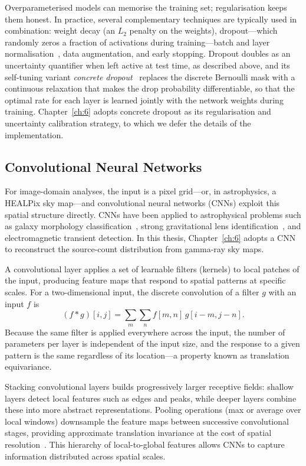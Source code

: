 Overparameterised models can memorise the training set; regularisation keeps them honest.
In practice, several complementary techniques are typically used in combination: weight decay (an $L_2$ penalty on the weights), dropout---which randomly zeros a fraction of activations during training---batch and layer normalisation~\cite{batchnorm}, data augmentation, and early stopping.
Dropout doubles as an uncertainty quantifier when left active at test time, as described above, and its self-tuning variant \textit{concrete dropout}~\cite{concrete-dropout} replaces the discrete Bernoulli mask with a continuous relaxation that makes the drop probability differentiable, so that the optimal rate for each layer is learned jointly with the network weights during training.
Chapter~\ref{ch:6} adopts concrete dropout as its regularisation and uncertainty calibration strategy, to which we defer the details of the implementation.

\subsection{Convolutional Neural Networks}
\label{sec:3.3.3}

For image-domain analyses, the input is a pixel grid---or, in astrophysics, a HEALPix sky map---and convolutional neural networks (CNNs) exploit this spatial structure directly.
CNNs have been applied to astrophysical problems such as galaxy morphology classification~\cite{Dieleman:2015wdg}, strong gravitational lens identification~\cite{Hezaveh:2017sht}, and electromagnetic transient detection.
In this thesis, Chapter~\ref{ch:6} adopts a CNN to reconstruct the source-count distribution from gamma-ray sky maps.

A convolutional layer applies a set of learnable filters (kernels) to local patches of the input, producing feature maps that respond to spatial patterns at specific scales.
For a two-dimensional input, the discrete convolution of a filter $g$ with an input $f$ is
\begin{equation}
	(f * g)[i,j] = \sum_{m}\sum_{n} f[m,n]\, g[i-m, j-n].
	\label{eq:conv2d}
\end{equation}
Because the same filter is applied everywhere across the input, the number of parameters per layer is independent of the input size, and the response to a given pattern is the same regardless of its location---a property known as translation equivariance.

Stacking convolutional layers builds progressively larger receptive fields: shallow layers detect local features such as edges and peaks, while deeper layers combine these into more abstract representations.
Pooling operations (max or average over local windows) downsample the feature maps between successive convolutional stages, providing approximate translation invariance at the cost of spatial resolution~\cite{Goodfellow:2016dlbook,LeCun:2015pmr}.
This hierarchy of local-to-global features allows CNNs to capture information distributed across spatial scales.

